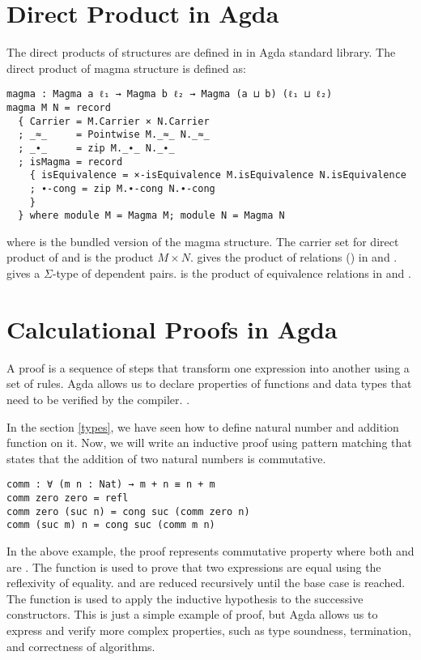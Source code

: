 \section{Direct Product in Agda}
The direct products of structures are defined in
 in Agda standard library. The direct
product of magma structure is defined as:
\begin{verbatim}
magma : Magma a ℓ₁ → Magma b ℓ₂ → Magma (a ⊔ b) (ℓ₁ ⊔ ℓ₂)
magma M N = record
  { Carrier = M.Carrier × N.Carrier
  ; _≈_     = Pointwise M._≈_ N._≈_
  ; _∙_     = zip M._∙_ N._∙_
  ; isMagma = record
    { isEquivalence = ×-isEquivalence M.isEquivalence N.isEquivalence
    ; ∙-cong = zip M.∙-cong N.∙-cong
    }
  } where module M = Magma M; module N = Magma N
\end{verbatim}
where  is the bundled version of the magma structure. The carrier
set for direct product of  and  is the product $M \times N$.
 gives the product of relations () in 
and .  gives a $\Sigma$-type of dependent pairs.
 is the product of equivalence relations in 
and .

\section{Calculational Proofs in Agda}
A proof is a sequence of steps that transform one expression into another using
a set of rules. Agda allows us to declare properties of functions and data types
that need to be verified by the compiler. \cite{kidney2020finiteness}.  

In the section \ref{types}, we have seen how to define natural number and addition
function on it. Now, we will write an inductive proof using pattern matching
that states that the addition of two natural numbers is commutative.

\begin{verbatim}
comm : ∀ (m n : Nat) → m + n ≡ n + m
comm zero zero = refl
comm zero (suc n) = cong suc (comm zero n)
comm (suc m) n = cong suc (comm m n)
\end{verbatim}

In the above example, the proof  represents commutative
property where both  and  are . The
 function is used to prove that two expressions are equal using the
reflexivity of equality.  and  are
reduced recursively until the base case is reached. The  function
is used to apply the inductive hypothesis to the successive 
constructors. This is just a simple example of proof, but Agda allows us to
express and verify more complex properties, such as type soundness, termination,
and correctness of algorithms.


